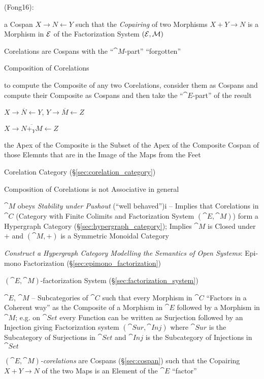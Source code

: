 (Fong16):

a Cospan $X \rightarrow N \leftarrow Y$ such that the \emph{Copairing}
of two Morphisms $X + Y \rightarrow N$ is a Morphism in $\mathcal{E}$ of
the Factorization System $(\mathcal{E}, \mathcal{M})$ %

Corelations are Cospans with the ``$\cat{M}$-part'' ``forgotten''

Composition of Corelations

to compute the Composite of any two Corelations, consider them as
Cospans and compute their Composite as Cospans and then take the
``$\cat{E}$-part'' of the result %

$X \rightarrow \overline{N} \leftarrow Y$, $Y \rightarrow \overline{M}
\leftarrow Z$

$X \rightarrow \overline{N +_Y M} \leftarrow Z$

the Apex of the Composite is the Subset of the Apex of the Composite
Cospan of those Elemnts that are in the Image of the Maps from the
Feet %

Corelation Category (\S\ref{sec:corelation_category})

Composition of Corelations is not Associative in general

$\cat{M}$ obeys \emph{Stability under Pushout} (``well behaved'')i --
Implies that Corelations in $\cat{C}$ (Category with Finite Colimits
and Factorization System $(\cat{E},\cat{M})$) form a Hypergraph
Category (\S\ref{sec:hypergraph_category}); Implies $\cat{M}$ is
Closed under $+$ and $(\cat{M},+)$ is a Symmetric Monoidal Category

\emph{Construct a Hypergraph Category Modelling the Semantics of Open
  Systems}: Epi-mono Factorization (\S\ref{sec:epimono_factorization})


$(\cat{E},\cat{M})$-factorization System
(\S\ref{sec:factorization_system})

$\cat{E}$, $\cat{M}$ -- Subcategories of $\cat{C}$ such that every
Morphism in $\cat{C}$ ``Factors in a Coherent way'' as the Composite
of a Morphism in $\cat{E}$ followed by a Morphism in $\cat{M}$; e.g.
on $\cat{Set}$ every Function can be written as Surjection followed by
an Injection giving Factorization system $(\cat{Sur},\cat{Inj})$ where
$\cat{Sur}$ is the Subcategory of Surjections in $\cat{Set}$ and
$\cat{Inj}$ is the Subcategory of Injections in $\cat{Set}$

\emph{$(\cat{E},\cat{M})$-corelations} are Cospans
(\S\ref{sec:cospan}) such that the Copairing $X + Y \rightarrow N$ of
the two Maps is an Element of the $\cat{E}$ ``factor''

